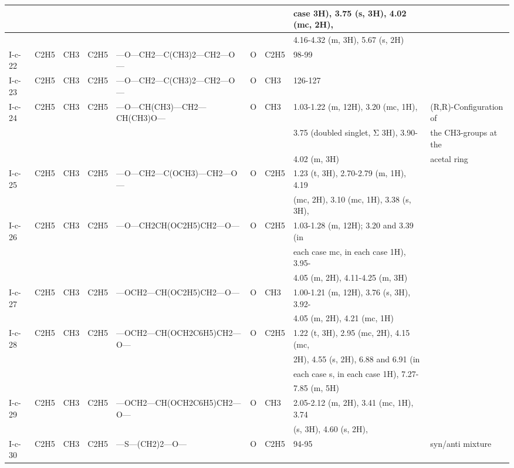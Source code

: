 \documentclass[11pt,a4paper]{article}
\begin{document}
\begin{table}[h]
\begin{tabular}{|l|l|l|l|l|l|l|l|l|}
 &  &  &  &  &  &  & case 3H), 3.75 (s, 3H), 4.02 (mc, 2H), &  \\ \hline
 &  &  &  &  &  &  & 4.16-4.32 (m, 3H), 5.67 (s, 2H) &  \\ \hline
I-c-22 & C2H5 & CH3 & C2H5 & —O—CH2—C(CH3)2—CH2—O— & O & C2H5 & 98-99 &  \\ \hline
I-c-23 & C2H5 & CH3 & C2H5 & —O—CH2—C(CH3)2—CH2—O— & O & CH3 & 126-127 &  \\ \hline
I-c-24 & C2H5 & CH3 & C2H5 & —O—CH(CH3)—CH2—CH(CH3)O— & O & CH3 & 1.03-1.22 (m, 12H), 3.20 (mc, 1H), & (R,R)-Configuration of \\ \hline
 &  &  &  &  &  &  & 3.75 (doubled singlet, Σ 3H), 3.90- & the CH3-groups at the \\ \hline
 &  &  &  &  &  &  & 4.02 (m, 3H) & acetal ring \\ \hline
I-c-25 & C2H5 & CH3 & C2H5 & —O—CH2—C(OCH3)—CH2—O— & O & C2H5 & 1.23 (t, 3H), 2.70-2.79 (m, 1H), 4.19 &  \\ \hline
 &  &  &  &  &  &  & (mc, 2H), 3.10 (mc, 1H), 3.38 (s, 3H), &  \\ \hline
I-c-26 & C2H5 & CH3 & C2H5 & —O—CH2CH(OC2H5)CH2—O— & O & C2H5 & 1.03-1.28 (m, 12H); 3.20 and 3.39 (in &  \\ \hline
 &  &  &  &  &  &  & each case mc, in each case 1H), 3.95- &  \\ \hline
 &  &  &  &  &  &  & 4.05 (m, 2H), 4.11-4.25 (m, 3H) &  \\ \hline
I-c-27 & C2H5 & CH3 & C2H5 & —OCH2—CH(OC2H5)CH2—O— & O & CH3 & 1.00-1.21 (m, 12H), 3.76 (s, 3H), 3.92- &  \\ \hline
 &  &  &  &  &  &  & 4.05 (m, 2H), 4.21 (mc, 1H) &  \\ \hline
I-c-28 & C2H5 & CH3 & C2H5 & —OCH2—CH(OCH2C6H5)CH2—O— & O & C2H5 & 1.22 (t, 3H), 2.95 (mc, 2H), 4.15 (mc, &  \\ \hline
 &  &  &  &  &  &  & 2H), 4.55 (s, 2H), 6.88 and 6.91 (in &  \\ \hline
 &  &  &  &  &  &  & each case s, in each case 1H), 7.27- &  \\ \hline
 &  &  &  &  &  &  & 7.85 (m, 5H) &  \\ \hline
I-c-29 & C2H5 & CH3 & C2H5 & —OCH2—CH(OCH2C6H5)CH2—O— & O & CH3 & 2.05-2.12 (m, 2H), 3.41 (mc, 1H), 3.74 &  \\ \hline
 &  &  &  &  &  &  & (s, 3H), 4.60 (s, 2H), &  \\ \hline
I-c-30 & C2H5 & CH3 & C2H5 & —S—(CH2)2—O— & O & C2H5 & 94-95 & syn/anti mixture \\ \hline

\end{tabular}
\end{table}
\end{document}
